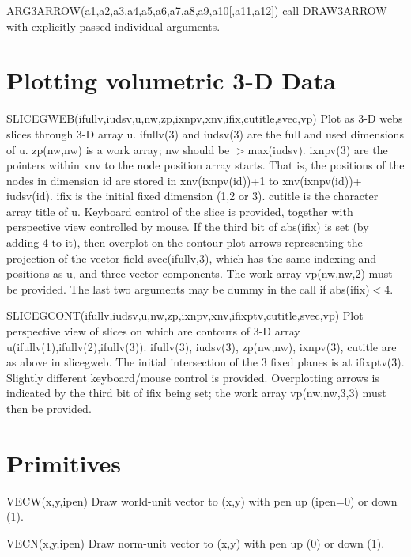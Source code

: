 \documentclass[12pt]{article}
\newif \iftth
\begin{document}
ARG3ARROW(a1,a2,a3,a4,a5,a6,a7,a8,a9,a10[,a11,a12]) call DRAW3ARROW
with explicitly passed individual arguments.

\section{Plotting volumetric 3-D Data}

\iftth \special{html:<a href="slicetest.f"><img align="left"
src="sgweb.jpg" width="400"></a>}\fi


SLICEGWEB(ifullv,iudsv,u,nw,zp,ixnpv,xnv,ifix,cutitle,svec,vp) Plot
as 3-D webs slices through 3-D array u. ifullv(3) and iudsv(3) are the
full and used dimensions of u. zp(nw,nw) is a work array; nw should be
$>$max(iudsv). ixnpv(3) are the pointers within xnv to the node
position array starts. That is, the positions of the nodes in
dimension id are stored in xnv(ixnpv(id))+1 to xnv(ixnpv(id))+
iudsv(id). ifix is the initial fixed dimension (1,2 or 3). cutitle is
the character array title of u. Keyboard control of the slice is
provided, together with perspective view controlled by mouse. If the
third bit of abs(ifix) is set (by adding 4 to it), then overplot on
the contour plot arrows representing the projection of the vector
field svec(ifullv,3), which has the same indexing and positions as u,
and three vector components. The work array vp(nw,nw,2) must be
provided.  The last two arguments may be dummy in the call if
abs(ifix)$<$4.

\iftth \special{html:<a href="slicetest.f"><img align="right"
src="sgcont.jpg" width="300"></a>}\fi

SLICEGCONT(ifullv,iudsv,u,nw,zp,ixnpv,xnv,ifixptv,cutitle,svec,vp) Plot
perspective view of slices on which are contours of 3-D array
u(ifullv(1),ifullv(2),ifullv(3)). ifullv(3), iudsv(3), zp(nw,nw),
ixnpv(3), cutitle are as above in slicegweb. The initial intersection
of the 3 fixed planes is at ifixptv(3). Slightly different
keyboard/mouse control is provided. Overplotting arrows is indicated
by the third bit of ifix being set; the work array vp(nw,nw,3,3)
must then be provided.


\section{Primitives}

VECW(x,y,ipen) Draw world-unit vector to (x,y) with pen up (ipen=0) or down (1).

VECN(x,y,ipen) Draw norm-unit vector to (x,y) with pen up (0) or down (1).
\end{document}
